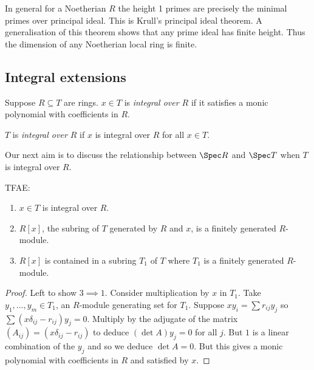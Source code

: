 \documentclass[a4paper]{article}
\begin{document}
\begin{remark}
  In general for a Noetherian \(R\) the height 1 primes are precisely the minimal primes over principal ideal. This is Krull's principal ideal theorem. A generalisation of this theorem shows that any prime ideal has finite height. Thus the dimension of any Noetherian local ring is finite.
\end{remark}

\subsection{Integral extensions}

\begin{definition}
  Suppose \(R \subseteq T\) are rings. \(x \in T\) is \emph{integral over \(R\)} if it satisfies a monic polynomial with coefficients in \(R\).

  \(T\) is \emph{integral over \(R\)} if \(x\) is integral over \(R\) for all \(x \in T\).
\end{definition}

Our next aim is to discuss the relationship between \(\Spec R\) and \(\Spec T\) when \(T\) is integral over \(R\).

\begin{lemma}
  TFAE:
  \begin{enumerate}
  \item \(x \in T\) is integral over \(R\).
  \item \(R[x]\), the subring of \(T\) generated by \(R\) and \(x\), is a finitely generated \(R\)-module.
  \item \(R[x]\) is contained in a subring \(T_1\) of \(T\) where \(T_1\) is a finitely generated \(R\)-module.
  \end{enumerate}
\end{lemma}

\begin{proof}
  Left to show \(3 \implies 1\). Consider multiplication by \(x\) in \(T_1\). Take \(y_1, \dots, y_m \in T_1\), an \(R\)-module generating set for \(T_1\). Suppose \(xy_i = \sum r_{ij} y_j\) so \(\sum (x \delta_{ij} - r_{ij}) y_j = 0\). Multiply by the adjugate of the matrix \((A_{ij}) = (x \delta_{ij} - r_{ij})\) to deduce \((\det A) y_j = 0\) for all \(j\). But \(1\) is a linear combination of the \(y_j\) and so we deduce \(\det A = 0\). But this gives a monic polynomial with coefficients in \(R\) and satisfied by \(x\).
\end{proof}
\end{document}
